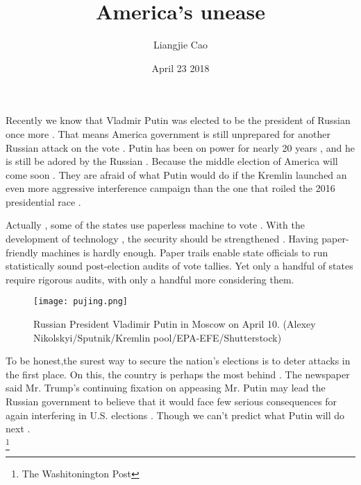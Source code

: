 \documentclass[50pt]{article}
\begin{document}
\title{America's unease}
\author{Liangjie Cao}
\date{April 23 2018}
\maketitle
\par
Recently we know that Vladmir Putin was elected to be the president of Russian once more . That means America government is still unprepared for another Russian attack on the vote . Putin has been on power for  nearly 20 years , and he is still be adored by the Russian . Because the middle election of America will come soon . They are afraid of what Putin would do if the Kremlin launched an even more aggressive interference campaign than the one that roiled the 2016 presidential race . \\
\par
Actually , some of the states use paperless machine to vote . With the development of technology , the security should be strengthened . Having paper-friendly machines is hardly enough. Paper trails enable state officials to run statistically sound post-election audits of vote tallies. Yet only a handful of states require rigorous audits, with only a handful more considering them.\\
 \begin{figure}[ht]
 \centering
 \texttt{[image: pujing.png]}\\
 \caption{ Russian President Vladimir Putin in Moscow on April 10. (Alexey Nikolskyi/Sputnik/Kremlin pool/EPA-EFE/Shutterstock)}
\end{figure}
\par
To be honest,the surest way to secure the nation’s elections is to deter attacks in the first place. On this, the country is perhaps the most behind . The newspaper said Mr. Trump’s continuing fixation on appeasing Mr. Putin may lead the Russian government to believe that it would face few serious consequences for again interfering in U.S. elections . Though we can't predict what Putin will do next . \\
\footnote{\centering The Washitonington Post}
\end{document}
